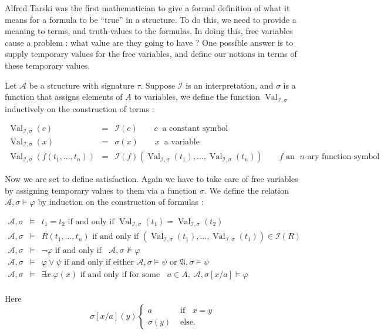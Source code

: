 \documentclass[12pt]{article}
\newcommand{\Or}{\vee}
\newcommand{\A}{\mathfrak{A}}
\newcommand{\I}{\mathcal{I}}
\newcommand{\val}{\operatorname{Val}}
\begin{document}
Alfred Tarski was the first mathematician to give a formal definition of what
it means for a formula to be ``true'' in a structure.  To do this, we
need to provide a meaning to terms, and truth-values to the formulas.
In doing this, free variables cause a problem : what value are they
going to have ?  One possible answer is to supply temporary values for the free variables, and define our notions in terms of these temporary values.

Let $\mathcal{A}$ be a structure with signature $\tau$.
Suppose $\I$ is an interpretation, and $\sigma$ is a function that
assigns elements of $A$ to variables, we define the function
$\val_{\I,\sigma}$ inductively on the construction of terms :

\begin{eqnarray*}
\val_{\I,\sigma}(c)& = &\I(c)\qquad c\;\;\text{a constant symbol}\\
\val_{\I,\sigma}(x)& = &\sigma(x)\qquad x\;\;\text{a variable}\\
\val_{\I,\sigma}(f(t_1,...,t_n))& = &\I(f)(\val_{\I,\sigma}(t_1),...,\val_{\I,\sigma}(t_n))\qquad f\text{ an }\; n\text{-ary function symbol}
\end{eqnarray*}

Now we are set to define satisfaction.  Again we have to take care of free variables by assigning temporary values to them via a function $\sigma$.  
We define the relation $\mathcal{A},\sigma\models\varphi$ by induction on the construction of formulas :

\begin{eqnarray*}
\mathcal{A},\sigma & \models & t_1=t_2\text{ if and only if 
}\val_{\I,\sigma}(t_1)=\val_{\I,\sigma}(t_2)\\
\mathcal{A},\sigma & \models & R(t_1,...,t_n)\text{ if and only if } 
(\val_{\I,\sigma}(t_1),...,\val_{\I,\sigma}(t_1))\in\I(R)\\
\mathcal{A},\sigma & \models & \neg\varphi\text{ if and only if }\;\;\mathcal{A},\sigma\not\models\varphi\\
\mathcal{A},\sigma & \models & \varphi\Or\psi \text{ if and only if either } 
\mathcal{A},\sigma\models\psi
\text{ or } \A,\sigma\models\psi \\
\mathcal{A},\sigma & \models &\exists x.\varphi(x)\text{ if and only if for some }
\;\;a\in A,\; \mathcal{A},\sigma[x/a]\models \varphi\\
\end{eqnarray*}

Here 
\begin{displaymath}
\sigma[x/a](y)\begin{cases}
a & \text{ if }\;\;x=y \\
\sigma(y) & \text{ else.}
\end{cases}
\end{displaymath}
\end{document}

